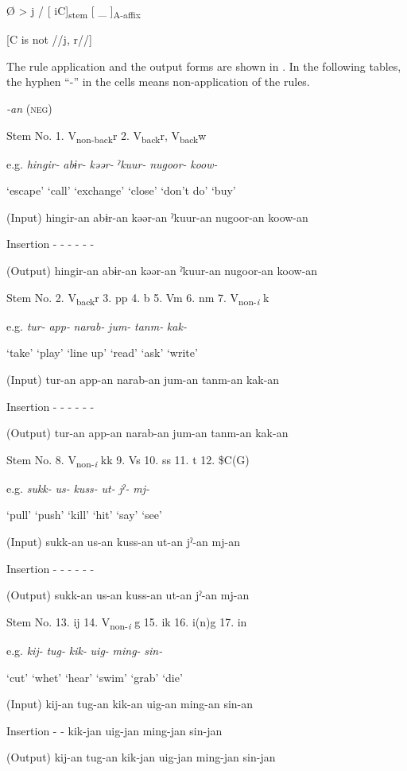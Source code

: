 \ea\label{ex:8-11}
  Ø  >  j  /  [   iC]\textsubscript{stem}  [ \_   ]\textsubscript{A-affix}

          [C is not //j, r//]  
\z

The rule application and the output forms are shown in . In the following tables, the hyphen “-” in the cells means non-application of the rules.

\begin{table}
\caption{\label{tab:key:60}Verbal stems +} \textmd{\textit{{}-an}}\textmd{ (\textsc{neg})}

Stem No.  1. V\textsubscript{non-back}r  2. V\textsubscript{back}r, V\textsubscript{back}w

e.g.  \textit{hingir-}  \textit{abɨr-}  \textit{kəər-}  \textit{ˀkuur-}  \textit{nugoor-}  \textit{koow-}

  ‘escape’  ‘call’  ‘exchange’  ‘close’  ‘don’t do’  ‘buy’

(Input)  hingir-an  abɨr-an  kəər-an  ˀkuur-an  nugoor-an  koow-an

Insertion  {}-  {}-  {}-  {}-  {}-  {}-

(Output)  hingir-an  abɨr-an  kəər-an  ˀkuur-an  nugoor-an  koow-an

Stem No.  2. V\textsubscript{back}r  3. pp  4. b  5. Vm  6. nm  7. V\textsubscript{non-}\textit{\textsubscript{i} }k

e.g.  \textit{tur-}  \textit{app-}  \textit{narab-}  \textit{jum-}  \textit{tanm-}  \textit{kak-}

  ‘take’  ‘play’  ‘line up’  ‘read’  ‘ask’  ‘write’

(Input)  tur-an  app-an  narab-an  jum-an  tanm-an  kak-an

Insertion  {}-  {}-  {}-  {}-  {}-  {}-

(Output)  tur-an  app-an  narab-an  jum-an  tanm-an  kak-an

Stem No.  8. V\textsubscript{non-}\textit{\textsubscript{i} }kk  9. Vs  10. ss  11. t  12. \$C(G)

e.g.  \textit{sukk-}  \textit{us-}  \textit{kuss-}  \textit{ut-}  \textit{jˀ-}  \textit{mj-}

  ‘pull’  ‘push’  ‘kill’  ‘hit’  ‘say’  ‘see’

(Input)  sukk-an  us-an  kuss-an  ut-an  jˀ-an  mj-an

Insertion  {}-  {}-  {}-  {}-  {}-  {}-

(Output)  sukk-an  us-an  kuss-an  ut-an  jˀ-an  mj-an

Stem No.  13. ij  14. V\textsubscript{non-}\textit{\textsubscript{i}} g  15. ik  16. i(n)g    17. in

e.g.  \textit{kij-}  \textit{tug-}  \textit{kik-}  \textit{uig-}  \textit{ming-}  \textit{sin-}

  ‘cut’  ‘whet’  ‘hear’  ‘swim’  ‘grab’  ‘die’

(Input)  kij-an  tug-an  kik-an  uig-an  ming-an  sin-an

Insertion  {}-  {}-  kik-jan  uig-jan  ming-jan  sin-jan

(Output)  kij-an  tug-an  kik-jan  uig-jan  ming-jan  sin-jan
\end{table}

